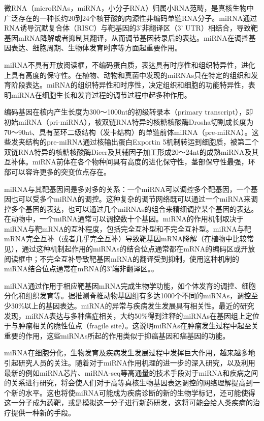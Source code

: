 微RNA（microRNAs，miRNA，小分子RNA）归属小RNA范畴，是真核生物中广泛存在的一种长约20到24个核苷酸的内源性非编码单链RNA分子。miRNA通过RNA诱导沉默复合体（RISC）与靶基因的3'非翻译区（3' UTR）相结合，导致靶基因mRNA降解或者抑制其翻译，从而调节基因转录后的表达。miRNA在调控基因表达、细胞周期、生物体发育时序等方面起重要作用。

miRNA不具有开放阅读框，不编码蛋白质，表达具有时序性和组织特异性，进化上具有高度的保守性。在植物、动物和真菌中发现的miRNAs只在特定的组织和发育阶段表达。miRNA的组织特异性和时序性，决定组织和细胞的功能特异性，表明miRNA在细胞生长和发育过程的调节过程中起多种作用。

编码基因在核内产生长度为300～1000nt的初级转录本（primary transcript），即初始miRNA（pri-miRNA），被双链RNA特异的核糖核酸酶Drosha切割成长度为70～90nt、具有茎环二级结构（发卡结构）的单链前体miRNA（pre-miRNA）。这些发夹结构的pre-miRNA通过核输出蛋白Exportin 5机制转运到细胞质，被第二个双链RNA特异的核糖核酸酶Dicer及其辅因子加工形成20～24nt的成熟miRNA及其互补体。miRNA前体在各个物种间具有高度的进化保守性，茎部保守性最强，环部可以容许更多的突变位点存在。

miRNA与其靶基因间是多对多的关系：一个miRNA可以调控多个靶基因，一个基因也可以受多个miRNA的调控。这种复杂的调节网络既可以通过一个miRNA来调控多个基因的表达，也可以通过几个miRNAs的组合来精细调控某个基因的表达。在动物中，一个miRNA通常可以调控数十个基因。miRNA的作用机制取决于miRNA与靶mRNA的互补程度，包括完全互补型和不完全互补型。miRNA与靶mRNA完全互补（或者几乎完全互补）导致靶基因mRNA降解（在植物中比较常见），通过这种机制起作用的miRNAs的结合位点通常都在mRNA的编码区或开放阅读框中；不完全互补导致靶基因mRNA的翻译受到抑制，使用这种机制的miRNA结合位点通常在mRNA的3'端非翻译区。。

miRNA通过作用于相应靶基因mRNA完成生物学功能，如个体发育的调控、细胞分化和组织发育等。据推测脊椎动物基因组有多达1000个不同的miRNAs，调控至少30\%以上的基因表达。miRNA的异常与疾病发生发展具有相关性。最近的研究发现，miRNA表达与多种癌症相关，大约50\%得到注释的miRNAs在基因组上定位于与肿瘤相关的脆性位点（fragile site）。这说明miRNAs在肿瘤发生过程中起至关重要的作用，这些miRNAs所起的作用类似于抑癌基因和癌基因的功能。

miRNA在细胞分化，生物发育及疾病发生发展过程中发挥巨大作用，越来越多地引起研究人员的关注。随着对于miRNA作用机理的进一步的深入研究，以及利用最新的例如miRNA芯片、miRNA-seq等高通量的技术手段对于miRNA和疾病之间的关系进行研究，将会使人们对于高等真核生物基因表达调控的网络理解提高到一个新的水平。这也将使miRNA可能成为疾病诊断的新的生物学标记，还可能使得这一分子成为药靶，或是模拟这一分子进行新药研发，这将可能会给人类疾病的治疗提供一种新的手段。

